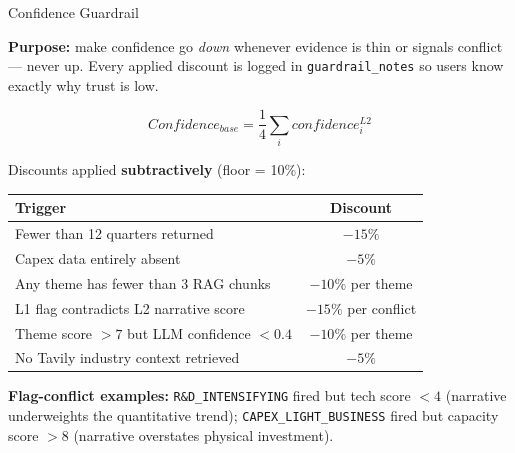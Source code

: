 \documentclass[aspectratio=169]{beamer}
\begin{document}
\begin{frame}{Confidence Guardrail}

\textbf{Purpose:} make confidence go \emph{down} whenever evidence is thin or
signals conflict --- never up. Every applied discount is logged in
\texttt{guardrail\_notes} so users know exactly why trust is low.

\vspace{0.3cm}
\[
Confidence_{base} = \frac{1}{4}\sum_{i} confidence_i^{L2}
\]

\vspace{0.2cm}
Discounts applied \textbf{subtractively} (floor = 10\%):

\begin{table}[h]
\centering
\small
\begin{tabular}{p{5.5cm} c}
\hline
\textbf{Trigger} & \textbf{Discount} \\
\hline
Fewer than 12 quarters returned & $-15\%$ \\
Capex data entirely absent & $-5\%$ \\
Any theme has fewer than 3 RAG chunks & $-10\%$ per theme \\
L1 flag contradicts L2 narrative score & $-15\%$ per conflict \\
Theme score $> 7$ but LLM confidence $< 0.4$ & $-10\%$ per theme \\
No Tavily industry context retrieved & $-5\%$ \\
\hline
\end{tabular}
\end{table}

\vspace{0.1cm}
\textbf{Flag-conflict examples:} \texttt{R\&D\_INTENSIFYING} fired but tech score
$< 4$ (narrative underweights the quantitative trend); \texttt{CAPEX\_LIGHT\_BUSINESS}
fired but capacity score $> 8$ (narrative overstates physical investment).

\end{frame}
\end{document}
